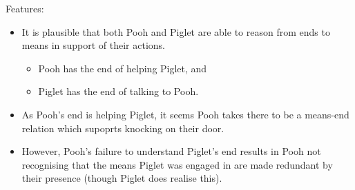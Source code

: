 \documentclass[10pt]{article}
\newcommand{\hozlinedash}[0]{%
  \noindent\hdashrule[0.5ex][c]{\textwidth}{.1pt}{2.5pt}
}
\begin{document}
Features:
\begin{itemize}[noitemsep]
\item It is plausible that both Pooh and Piglet are able to reason from ends to means in support of their actions.
  \begin{itemize}[noitemsep]
  \item Pooh has the end of helping Piglet, and
  \item Piglet has the end of talking to Pooh.
  \end{itemize}
\item As Pooh's end is helping Piglet, it seems Pooh takes there to be a means-end relation which supoprts knocking on their door.
\item However, Pooh's failure to understand Piglet's end results in Pooh not recognising that the means Piglet was engaged in are made redundant by their presence (though Piglet does realise this).
\end{itemize}







\newpage


\printbibliography








\end{document}
